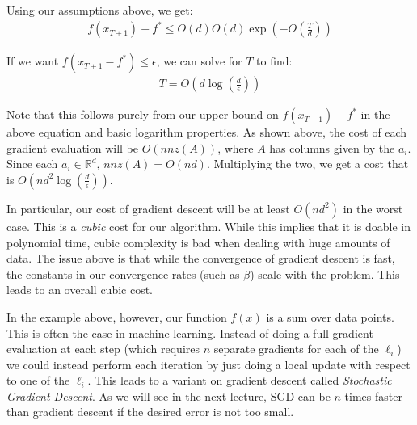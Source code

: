 \documentclass[12pt]{report}
\def\real{\mathbb R}
\begin{document}
Using our assumptions above, we get:
\begin{align*}
f(x_{T+1})-f^* \leq O(d)O(d)\exp(-O(\frac{T}{d}))\end{align*}

If we want $f(x_{T+1}-f^*) \leq \epsilon$, we can solve for $T$ to find:
\begin{align*}
T = O(d\log(\frac{d}{\epsilon}))\end{align*}

Note that this follows purely from our upper bound on $f(x_{T+1})-f^*$ in the above equation and basic logarithm properties. As shown above, the cost of each gradient evaluation will be $O(nnz(A))$, where $A$ has columns given by the $a_i$. Since each $a_i \in \real^d$, $nnz(A) = O(nd)$. Multiplying the two, we get a cost that is $O(nd^2\log(\frac{d}{\epsilon}))$.

\medskip

In particular, our cost of gradient descent will be at least $O(nd^2)$ in the worst case. This is a {\it cubic} cost for our algorithm. While this implies that it is doable in polynomial time, cubic complexity is bad when dealing with huge amounts of data. The issue above is that while the convergence of gradient descent is fast, the constants in our convergence rates (such as $\beta$) scale with the problem. This leads to an overall cubic cost.

\medskip

In the example above, however, our function $f(x)$ is a sum over data points. This is often the case in machine learning. Instead of doing a full gradient evaluation at each step (which requires $n$ separate gradients for each of the $\ell_i$) we could instead perform each iteration by just doing a local update with respect to one of the $\ell_i$. This leads to a variant on gradient descent called {\it Stochastic Gradient Descent}. As we will see in the next lecture, SGD can be $n$ times faster than gradient descent if the desired error is not too small.
\end{document}

